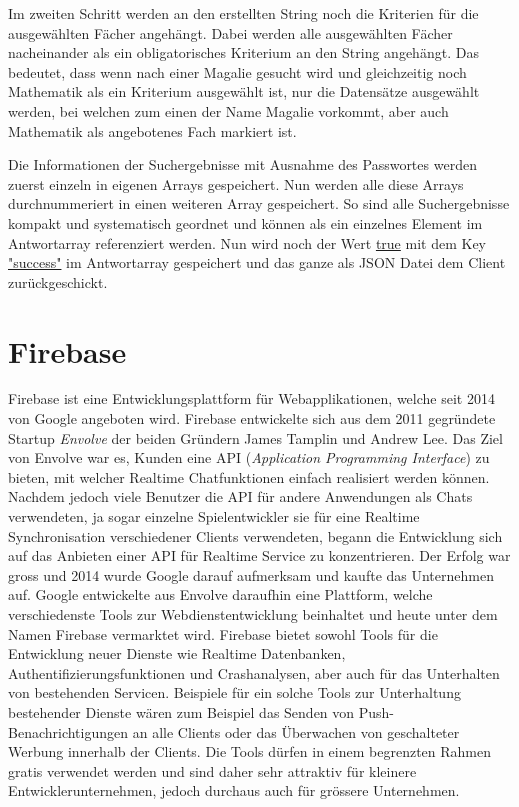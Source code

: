 \documentclass[a4paper,11pt]{report}
\begin{document}
					Im zweiten Schritt werden an den erstellten String noch die Kriterien für die ausgewählten Fächer angehängt. Dabei werden alle ausgewählten Fächer nacheinander als ein obligatorisches Kriterium an den String angehängt. Das bedeutet, dass wenn nach einer \glqq Magalie\grqq{} gesucht wird und gleichzeitig noch Mathematik als ein Kriterium ausgewählt ist, nur die Datensätze ausgewählt werden, bei welchen zum einen der Name \glqq Magalie\grqq{} vorkommt, aber auch Mathematik als angebotenes Fach markiert ist.
					
					Die Informationen der Suchergebnisse mit Ausnahme des Passwortes werden zuerst einzeln in eigenen Arrays gespeichert. Nun werden alle diese Arrays durchnummeriert in einen weiteren Array gespeichert. So sind alle Suchergebnisse kompakt und systematisch geordnet und können als ein einzelnes Element im Antwortarray referenziert werden. Nun wird noch der Wert \url{true} mit dem Key \url{"success"} im Antwortarray gespeichert und das ganze als JSON Datei dem Client zurückgeschickt.
					
					
			\section{Firebase} \label{fb}
			Firebase ist eine  Entwicklungsplattform für Webapplikationen, welche seit 2014 von Google angeboten wird. Firebase entwickelte sich aus dem 2011 gegründete Startup \emph{Envolve} der beiden Gründern James Tamplin und Andrew Lee. Das Ziel von Envolve war es, Kunden eine API (\emph{Application Programming Interface}) zu bieten, mit welcher Realtime Chatfunktionen einfach realisiert werden können. Nachdem jedoch viele Benutzer die API für andere Anwendungen als Chats verwendeten, ja sogar einzelne Spielentwickler sie für eine Realtime Synchronisation verschiedener Clients verwendeten, begann die Entwicklung sich auf das Anbieten einer API für Realtime Service zu konzentrieren. Der Erfolg war gross und 2014 wurde Google darauf aufmerksam und kaufte das Unternehmen auf. Google entwickelte aus Envolve daraufhin eine Plattform, welche verschiedenste Tools zur Webdienstentwicklung beinhaltet und heute unter dem Namen Firebase vermarktet wird. Firebase bietet sowohl Tools für die Entwicklung neuer Dienste wie Realtime Datenbanken, Authentifizierungsfunktionen und Crashanalysen, aber auch für das Unterhalten von bestehenden Servicen. Beispiele für ein solche Tools zur Unterhaltung bestehender Dienste wären zum Beispiel das Senden von Push-Benachrichtigungen an alle Clients oder das Überwachen von geschalteter Werbung innerhalb der Clients. Die Tools dürfen in einem begrenzten Rahmen gratis verwendet werden und sind daher sehr attraktiv für kleinere Entwicklerunternehmen, jedoch durchaus auch für grössere Unternehmen.\cite{Firebase}
				
\end{document}
